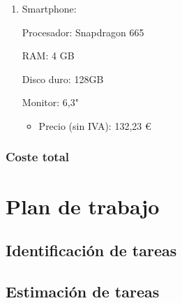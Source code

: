 \documentclass[12pt,a4paper,onecolumn,oneside]{report}
\begin{document}
\begin{enumerate}
	
	\item Smartphone:
	
	Procesador: Snapdragon 665
	
	RAM: 4 GB
	
	Disco duro: 128GB
	
	Monitor: 6,3"
	
	\begin{itemize}
		\item Precio (sin IVA): 132,23 \euro\\
	\end{itemize}
	
\end{enumerate}




\subsubsection{Coste total}

\begin{table}[ht]
	\centering
	\caption{Presupuesto total}
	\label{tabla3}
\end{table}

\section{Plan de trabajo}
\label{Plan de trabajo}


\subsection{Identificación de tareas}

\subsection{Estimación de tareas}
\end{document}
